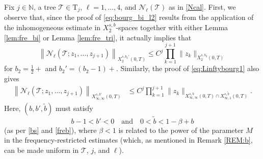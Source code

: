 \documentclass[a4paper,
11pt,  reqno]{amsart}
\newcommand{\5}{\textup{V}}
\newcommand{\wt}{\widetilde}
\theoremstyle{remark}
\newcommand{\TT}{\mathcal{T}}
\newcommand{\Tr}{\mathrm{T}}
\renewcommand{\l}{\ell}
\newcommand{\N}{\mathbb{N}}
\numberwithin{equation}{section}
\numberwithin{theorem}{section}
\newcommand{\Ncal}{\mathcal{N}}
\begin{document}
Fix $j\in\N$, a tree $\TT\in \Tr_j$,  $\ell=1,\dots,4$, and $\Ncal_\l(\TT)$ as in \eqref{Ncal}. First, we observe that, since the proof of \eqref{eq:bourg_bi_l2} results from the application of the inhomogeneous estimate in $X_2^{s,b}$-spaces together with either Lemma \ref{lem:fre_bi} or Lemma \ref{lem:fre_tri}, it actually implies that
\begin{equation}\label{eq:L2_interp}
		\left\| \Ncal_\l(\TT; z_1,\dots, z_{j+1})\right\|_{X^{s,b_2'}_{2}(0,T)}  \le  C^j\prod_{k=1}^{j+1}\|z_k\|_{X^{s,b_2}_{2}(0,T)}
\end{equation}
for $b_2=\frac12 +$ and $b_2'=(b_2-1)+$. Similarly, the proof of \eqref{eq:Linftybourg1} also gives
\begin{align*}
    \left\| \Ncal_\l(\TT; z_1,\dots, z_{j+1})\right\|_{X^{s,b'}_{\infty, \infty}(0,T)} &\le  C^j\prod_{k=1}^{j+1}\|z_k\|_{X^{s,b}_{\infty, \infty} (0,T) \cap X^{s,\wt{b}}_{\infty,1}(0,T)}.
\end{align*}
Here, $(b, b', \wt{b})$ must satisfy
\begin{equation}\label{eq:cond_lp}
    b-1<b'<0
    \quad
    \text{and}
    \quad
    0<\wt{b}<1-\beta + b
\end{equation}
(as per \eqref{bs} and \eqref{freb}),
where $\beta<1$ is related to the power of the parameter $M$ in the frequency-restricted estimates (which, as mentioned in Remark \ref{REM:b}, can be made uniform in $\TT$, $j$, and $\l$).
\end{document}
